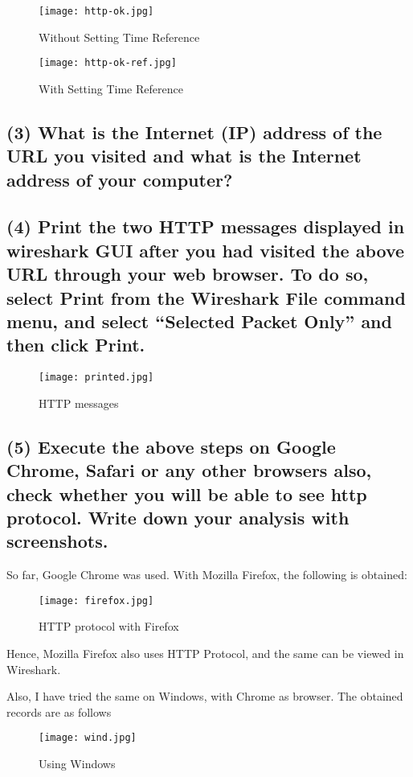 \documentclass{article}
\begin{document}
\begin{figure}[!hbt]
    \centering
    \texttt{[image: http-ok.jpg]}
    \caption{Without Setting Time Reference}
    \label{fig:my_labe223l}
\end{figure}
\begin{figure}[!hbt]
    \centering
    \texttt{[image: http-ok-ref.jpg]}
    \caption{With Setting Time Reference}
    \label{fig:my_labe22dd3l}
\end{figure}

\subsection*{(3) What is the Internet (IP) address of the URL you visited and what is the Internet address of your computer?}



\subsection*{(4) Print the two HTTP messages displayed in wireshark GUI after you had visited the above URL through your web browser. To do so, select Print from the Wireshark File command menu, and select “Selected Packet Only” and then click Print.}
\begin{figure}[!hbt]
    \centering
    \texttt{[image: printed.jpg]}
    \caption{HTTP messages}
    \label{fig:my_labe22jdd3l}
\end{figure}

\subsection*{(5) Execute the above steps on Google Chrome, Safari or any other browsers also, check whether you will be able to see http protocol. Write down your analysis with screenshots.}
So far, Google Chrome was used. With Mozilla Firefox, the following is obtained:

\begin{figure}[!hbt]
    \centering
    \texttt{[image: firefox.jpg]}
    \caption{HTTP protocol with Firefox}
    \label{fig:my_labe22jdd3l}
\end{figure}

Hence, Mozilla Firefox also uses HTTP Protocol, and the same can be viewed in Wireshark. 

Also, I have tried the same on Windows, with Chrome as browser. The obtained records are as follows
\begin{figure}[!hbt]
    \centering
    \texttt{[image: wind.jpg]}
    \caption{Using Windows}
    \label{fig:my_labe2jj2jdd3l}
\end{figure}
\end{document}
